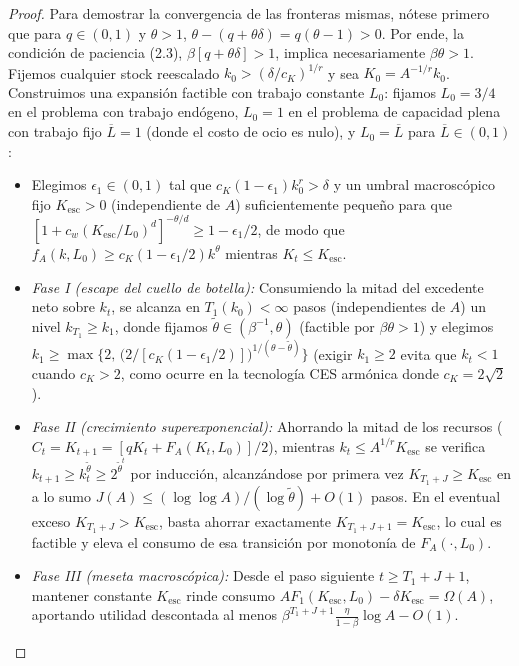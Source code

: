 \documentclass[11pt,letterpaper]{article}
\theoremstyle{plain}
\begin{document}
\begin{proof}
Para demostrar la convergencia de las fronteras mismas, nótese primero que para $q\in(0,1)$ y $\theta>1$, $\theta - (q+\theta\delta)=q(\theta-1)>0$. Por ende, la condición de paciencia (2.3), $\beta[q+\theta\delta]>1$, implica necesariamente $\beta\theta > 1$. Fijemos cualquier stock reescalado $k_0 > (\delta/c_K)^{1/r}$ y sea $K_0 = A^{-1/r}k_0$. Construimos una expansión factible con trabajo constante $L_0$: fijamos $L_0=3/4$ en el problema con trabajo endógeno, $L_0=1$ en el problema de capacidad plena con trabajo fijo $\overline{L}=1$ (donde el costo de ocio es nulo), y $L_0=\overline{L}$ para $\overline{L}\in(0,1)$:
\begin{itemize}
\item Elegimos $\epsilon_1\in(0,1)$ tal que $c_K(1-\epsilon_1)k_0^r > \delta$ y un umbral macroscópico fijo $K_{\mathrm{esc}}>0$ (independiente de $A$) suficientemente pequeño para que $[1+c_w(K_{\mathrm{esc}}/L_0)^d]^{-\theta/d}\ge 1-\epsilon_1/2$, de modo que $f_A(k,L_0)\ge c_K(1-\epsilon_1/2)k^\theta$ mientras $K_t\le K_{\mathrm{esc}}$.
\item \emph{Fase I (escape del cuello de botella):} Consumiendo la mitad del excedente neto sobre $k_t$, se alcanza en $T_1(k_0)<\infty$ pasos (independientes de $A$) un nivel $k_{T_1} \ge k_1$, donde fijamos $\tilde{\theta}\in(\beta^{-1},\theta)$ (factible por $\beta\theta>1$) y elegimos $k_1 \ge \max\!\big\{2,\,\big(2/[c_K(1-\epsilon_1/2)]\big)^{1/(\theta-\tilde{\theta})}\big\}$ (exigir $k_1\ge 2$ evita que $k_t<1$ cuando $c_K>2$, como ocurre en la tecnología CES armónica donde $c_K=2\sqrt{2}$).
\item \emph{Fase II (crecimiento superexponencial):} Ahorrando la mitad de los recursos ($C_t=K_{t+1}=[qK_t+F_A(K_t,L_0)]/2$), mientras $k_t\le A^{1/r}K_{\mathrm{esc}}$ se verifica $k_{t+1}\ge k_t^{\tilde{\theta}}\ge 2^{\tilde{\theta}^t}$ por inducción, alcanzándose por primera vez $K_{T_1+J}\ge K_{\mathrm{esc}}$ en a lo sumo $J(A)\le (\log\log A)/(\log\tilde{\theta}) + O(1)$ pasos. En el eventual exceso $K_{T_1+J}>K_{\mathrm{esc}}$, basta ahorrar exactamente $K_{T_1+J+1}=K_{\mathrm{esc}}$, lo cual es factible y eleva el consumo de esa transición por monotonía de $F_A(\cdot,L_0)$.
\item \emph{Fase III (meseta macroscópica):} Desde el paso siguiente $t\ge T_1+J+1$, mantener constante $K_{\mathrm{esc}}$ rinde consumo $AF_1(K_{\mathrm{esc}},L_0)-\delta K_{\mathrm{esc}}=\Omega(A)$, aportando utilidad descontada al menos $\beta^{T_1+J+1}\frac{\eta}{1-\beta}\log A - O(1)$.
\end{itemize}

\end{proof}
\end{document}
